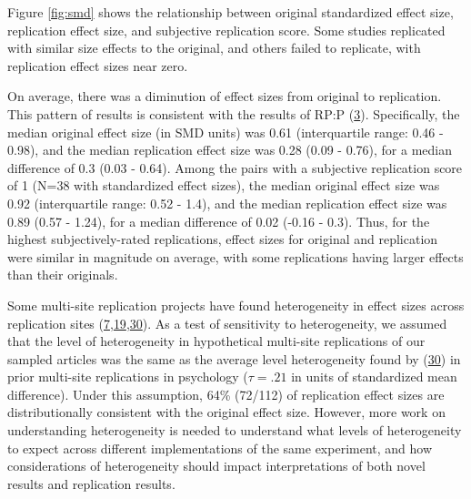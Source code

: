\documentclass[
  english,
  a4paper,
]{article}
\begin{document}
Figure \ref{fig:smd} shows the relationship between original standardized effect size, replication effect size, and subjective replication score. Some studies replicated with similar size effects to the original, and others failed to replicate, with replication effect sizes near zero.

On average, there was a diminution of effect sizes from original to replication. This pattern of results is consistent with the results of RP:P (\protect\hyperlink{ref-openscienceconsortium2015}{3}). Specifically, the median original effect size (in SMD units) was 0.61 (interquartile range: 0.46 - 0.98), and the median replication effect size was 0.28 (0.09 - 0.76), for a median difference of 0.3 (0.03 - 0.64). Among the pairs with a subjective replication score of 1 (N=38 with standardized effect sizes), the median original effect size was 0.92 (interquartile range: 0.52 - 1.4), and the median replication effect size was 0.89 (0.57 - 1.24), for a median difference of 0.02 (-0.16 - 0.3). Thus, for the highest subjectively-rated replications, effect sizes for original and replication were similar in magnitude on average, with some replications having larger effects than their originals.

Some multi-site replication projects have found heterogeneity in effect sizes across replication sites (\protect\hyperlink{ref-klein2018}{7},\protect\hyperlink{ref-ebersole2020}{19},\protect\hyperlink{ref-olsson2020}{30}). As a test of sensitivity to heterogeneity, we assumed that the level of heterogeneity in hypothetical multi-site replications of our sampled articles was the same as the average level heterogeneity found by (\protect\hyperlink{ref-olsson2020}{30}) in prior multi-site replications in psychology (\(\tau=.21\) in units of standardized mean difference). Under this assumption, 64\% (72/112) of replication effect sizes are distributionally consistent with the original effect size. However, more work on understanding heterogeneity is needed to understand what levels of heterogeneity to expect across different implementations of the same experiment, and how considerations of heterogeneity should impact interpretations of both novel results and replication results.
\end{document}
